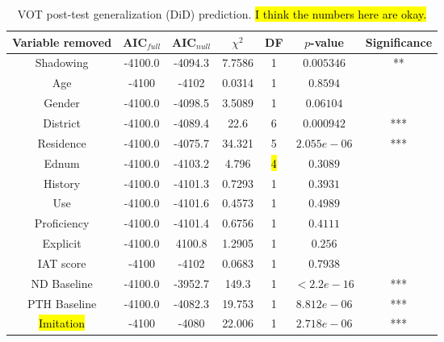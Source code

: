 \begin{table}
\centering
 \begin{tabular}{|c||c|c|c|c|c|c|} 
 \hline
 \textbf{Variable removed} & \textbf{AIC$_{full}$} & \textbf{AIC$_{null}$} & $\chi^2$ & \textbf{DF} & \textbf{$p$-value} & \textbf{Significance}\\ [0.5ex] 
 \hline
  Shadowing & -4100.0 & -4094.3 & 7.7586 & 1 & $0.005346$ & **\\ 
 \hline
 Age & -4100 & -4102 & 0.0314 & 1 & $0.8594$ & \\
 \hline
 Gender & -4100.0 & -4098.5 & 3.5089 & 1 & $0.06104$ & \\
 \hline
 District & -4100.0 & -4089.4 & 22.6 & 6 & $0.000942$ & ***\\
 \hline
 Residence & -4100.0 & -4075.7 & 34.321 & 5 & $2.055e-06$ & ***\\
 \hline
 Ednum & -4100.0 & -4103.2 & 4.796 & \hl{4} & $0.3089$ & \\
 \hline
 History & -4100.0 & -4101.3 & 0.7293 & 1 & $0.3931$ & \\
 \hline
 Use & -4100.0 & -4101.6 & 0.4573 & 1 & $0.4989$ & \\
 \hline
 Proficiency & -4100.0 & -4101.4 & 0.6756 & 1 & $0.4111$ & \\
 \hline
 Explicit & -4100.0 & 4100.8 & 1.2905 & 1 & $0.256$ & \\
 \hline
 IAT score & -4100 & -4102 & 0.0683 & 1 & $0.7938$ & \\
 \hline
 ND Baseline & -4100.0 & -3952.7 & 149.3 & 1 & $< 2.2e-16$ & ***\\
 \hline
 PTH Baseline & -4100.0 & -4082.3 & 19.753 & 1 & $8.812e-06$ & ***\\
 \hline
 \hl{Imitation} & -4100 & -4080 & 22.006 & 1 & $2.718e-06$ & ***\\%
 \hline
\end{tabular}
\caption{VOT post-test generalization (DiD) prediction. \hl{I think the numbers here are okay.}}
\label{tab:VOTpostPredictors}
\end{table}

